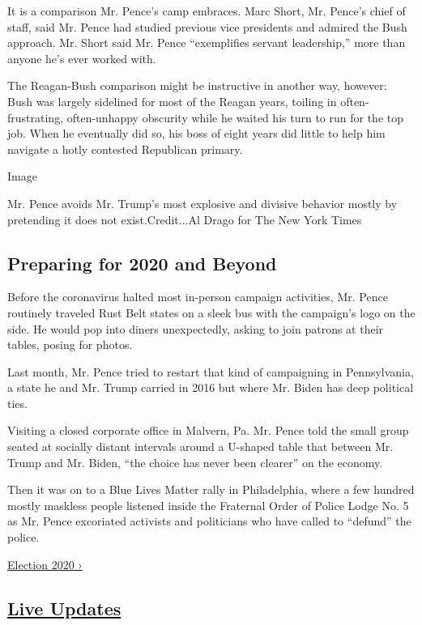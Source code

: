 It is a comparison Mr. Pence's camp embraces. Marc Short, Mr. Pence's
chief of staff, said Mr. Pence had studied previous vice presidents and
admired the Bush approach. Mr. Short said Mr. Pence ``exemplifies
servant leadership,'' more than anyone he's ever worked with.

The Reagan-Bush comparison might be instructive in another way, however:
Bush was largely sidelined for most of the Reagan years, toiling in
often-frustrating, often-unhappy obscurity while he waited his turn to
run for the top job. When he eventually did so, his boss of eight years
did little to help him navigate a hotly contested Republican primary.

Image

Mr. Pence avoids Mr. Trump's most explosive and divisive behavior mostly
by pretending it does not exist.Credit...Al Drago for The New York Times

\hypertarget{preparing-for-2020-and-beyond}{%
\subsection{Preparing for 2020 and
Beyond}\label{preparing-for-2020-and-beyond}}

Before the coronavirus halted most in-person campaign activities, Mr.
Pence routinely traveled Rust Belt states on a sleek bus with the
campaign's logo on the side. He would pop into diners unexpectedly,
asking to join patrons at their tables, posing for photos.

Last month, Mr. Pence tried to restart that kind of campaigning in
Pennsylvania, a state he and Mr. Trump carried in 2016 but where Mr.
Biden has deep political ties.

Visiting a closed corporate office in Malvern, Pa. Mr. Pence told the
small group seated at socially distant intervals around a U-shaped table
that between Mr. Trump and Mr. Biden, ``the choice has never been
clearer'' on the economy.

Then it was on to a Blue Lives Matter rally in Philadelphia, where a few
hundred mostly maskless people listened inside the Fraternal Order of
Police Lodge No. 5 as Mr. Pence excoriated activists and politicians who
have called to ``defund'' the police.

\href{https://www.nytimes3xbfgragh.onion/news-event/2020-election}{Election
2020 ›}

\hypertarget{live-updates}{%
\subsection{\texorpdfstring{\href{https://www.nytimes3xbfgragh.onion/live/2020/09/09/us/trump-vs-biden}{Live
Updates}}{Live Updates}}\label{live-updates}}

